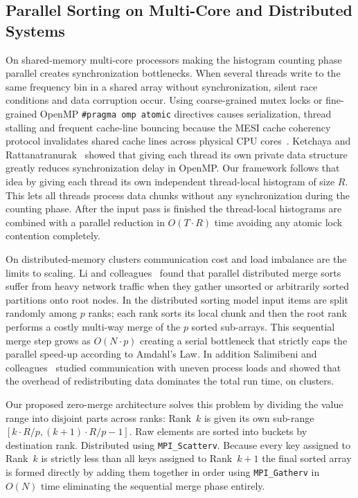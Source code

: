 \documentclass[conference]{IEEEtran}
\begin{document}
\subsection{Parallel Sorting on Multi-Core and Distributed Systems}
On shared-memory multi-core processors making the histogram counting phase parallel creates synchronization bottlenecks. When several threads write to the same frequency bin in a shared array without synchronization, silent race conditions and data corruption occur. Using coarse-grained mutex locks or fine-grained OpenMP \texttt{\#pragma omp atomic} directives causes serialization, thread stalling and frequent cache-line bouncing because the MESI cache coherency protocol invalidates shared cache lines across physical CPU cores~\cite{ketchaya2023}. Ketchaya and Rattanatranurak~\cite{ketchaya2023} showed that giving each thread its own private data structure greatly reduces synchronization delay in OpenMP. Our framework follows that idea by giving each thread its own independent thread-local histogram of size $R$. This lets all threads process data chunks without any synchronization during the counting phase. After the input pass is finished the thread-local histograms are combined with a parallel reduction in $O(T \cdot R)$ time avoiding any atomic lock contention completely.

On distributed-memory clusters communication cost and load imbalance are the limits to scaling. Li and colleagues~\cite{li2022} found that parallel distributed merge sorts suffer from heavy network traffic when they gather unsorted or arbitrarily sorted partitions onto root nodes. In the distributed sorting model input items are split randomly among $p$ ranks; each rank sorts its local chunk and then the root rank performs a costly multi-way merge of the $p$ sorted sub-arrays. This sequential merge step grows as $O(N \cdot p)$ creating a serial bottleneck that strictly caps the parallel speed-up according to Amdahl's Law. In addition Salimibeni and colleagues~\cite{salimibeni2024} studied communication with uneven process loads and showed that the overhead of redistributing data dominates the total run time, on clusters.

Our proposed zero-merge architecture solves this problem by dividing the value range into disjoint parts across ranks: Rank~$k$ is given its own sub-range $[k \cdot R/p, (k + 1) \cdot R/p - 1]$. Raw elements are sorted into buckets by destination rank. Distributed using \texttt{MPI\_Scatterv}. Because every key assigned to Rank~$k$ is strictly less than all keys assigned to Rank~$k + 1$ the final sorted array is formed directly by adding them together in order using \texttt{MPI\_Gatherv} in $O(N)$ time eliminating the sequential merge phase entirely.
\end{document}
